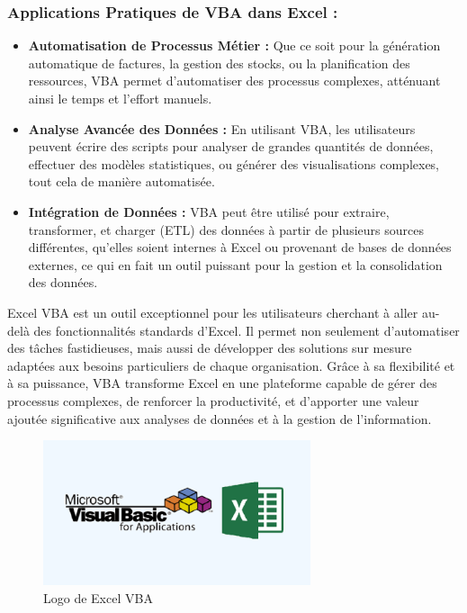 \documentclass[a4paper, oneside, 12pt, final]{extreport}
\begin{document}
\subsubsection{Applications Pratiques de VBA dans Excel :}
\begin{itemize}
\item \textbf{Automatisation de Processus Métier :} Que ce soit pour la génération automatique de factures, la gestion des stocks, ou la planification des ressources, VBA permet d'automatiser des processus complexes, atténuant ainsi le temps et l'effort manuels.
\item \textbf{Analyse Avancée des Données :} En utilisant VBA, les utilisateurs peuvent écrire des scripts pour analyser de grandes quantités de données, effectuer des modèles statistiques, ou générer des visualisations complexes, tout cela de manière automatisée.
\item \textbf{Intégration de Données :} VBA peut être utilisé pour extraire, transformer, et charger (ETL) des données à partir de plusieurs sources différentes, qu'elles soient internes à Excel ou provenant de bases de données externes, ce qui en fait un outil puissant pour la gestion et la consolidation des données.
\end{itemize}
Excel VBA est un outil exceptionnel pour les utilisateurs cherchant à aller au-delà des fonctionnalités standards d'Excel. Il permet non seulement d'automatiser des tâches fastidieuses, mais aussi de développer des solutions sur mesure adaptées aux besoins particuliers de chaque organisation. Grâce à sa flexibilité et à sa puissance, VBA transforme Excel en une plateforme capable de gérer des processus complexes, de renforcer la productivité, et d'apporter une valeur ajoutée significative aux analyses de données et à la gestion de l'information.
\begin{figure}[h]
    \centering
    \includegraphics[width=0.7\textwidth]{Microsoft Excel VBA.png} %
    \caption{Logo de Excel VBA}
    \label{fig:Logo de Excel VBA}
\end{figure}
\end{document}
